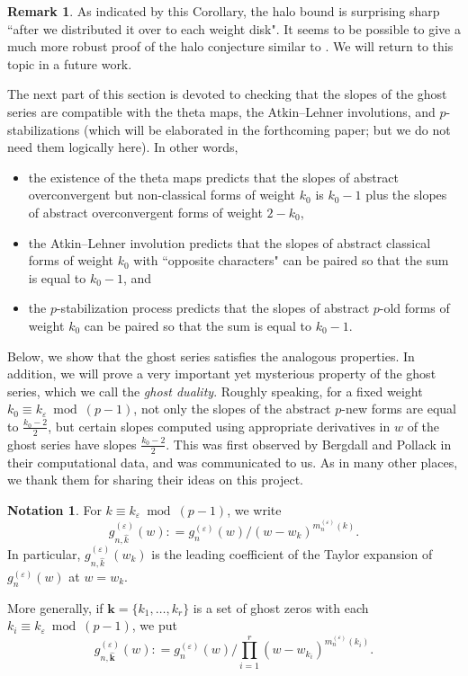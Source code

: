 \documentclass[12pt]{amsart}
\theoremstyle{definition}
\newtheorem{remark}[subsection]{Remark}
\newtheorem{notation}[subsection]{Notation}
\numberwithin{equation}{subsection}
\def\bfk{\mathbf{k}}
\begin{document}
\begin{remark}
\label{R:modified halo bound sharp}
As indicated by this Corollary, the halo bound is surprising sharp ``after we distributed it over to each weight disk". It seems to be possible to give a much more robust proof of the halo conjecture similar to \cite{liu-wan-xiao}. We will return to this topic in a future work.
\end{remark}



The next part of this section is devoted to checking that the slopes of the ghost series are compatible with the theta maps, the Atkin--Lehner involutions, and $p$-stabilizations (which will be elaborated in the forthcoming paper; but we do not need them logically here). In other words, 
\begin{itemize}
\item 
the existence of the theta maps predicts that the slopes of abstract overconvergent but non-classical forms of weight $k_0$ is $k_0-1$ plus the slopes of abstract overconvergent forms of weight $2-k_0$,
\item 
the Atkin--Lehner involution predicts that the slopes of abstract classical forms of weight $k_0$ with ``opposite characters" can be paired so that the sum is equal to $k_0-1$, and
\item
the $p$-stabilization process predicts that the slopes of abstract $p$-old forms of weight $k_0$ can be paired so that the sum is equal to $k_0-1$.
\end{itemize}
Below, we show that the ghost series satisfies the analogous properties.
In addition, we will prove a very important yet mysterious property of the ghost series, which we call the \emph{ghost duality}. Roughly speaking, for a fixed weight $k_0 \equiv k_\varepsilon \bmod{(p-1)}$, not only the slopes of the abstract $p$-new forms  are equal to $\frac{k_0-2}2$, but certain slopes computed using appropriate derivatives in $w$ of the ghost series have slopes $\frac{k_0-2}2$. This was first observed by Bergdall and Pollack in their computational data, and was communicated to us. As in many other places, we thank them for sharing their ideas on this project.

\begin{notation}
\label{N:gnhatk}
For $k \equiv k_\varepsilon \bmod {(p-1)}$, we write 
$$
g^{(\varepsilon)}_{n,\hat k}(w): = g_n^{(\varepsilon)}(w) \big/ (w-w_k)^{m_n^{(\varepsilon)}(k)}.
$$
In particular, $g^{(\varepsilon)}_{n,\hat k}(w_k)$ is the leading coefficient of the Taylor expansion of $g_n^{(\varepsilon)}(w)$ at $w=w_k$.

More generally, if $\bfk = \{k_1, \dots, k_r\}$ is a set of ghost zeros with each $k_i \equiv k_\varepsilon \bmod (p-1)$, we put
$$
g^{(\varepsilon)}_{n,\hat {\bfk}}(w): = g_n^{(\varepsilon)}(w) \big/ \prod_{i=1}^r(w-w_{k_i})^{m_n^{(\varepsilon)}(k_i)}.
$$
\end{notation}
\end{document}

